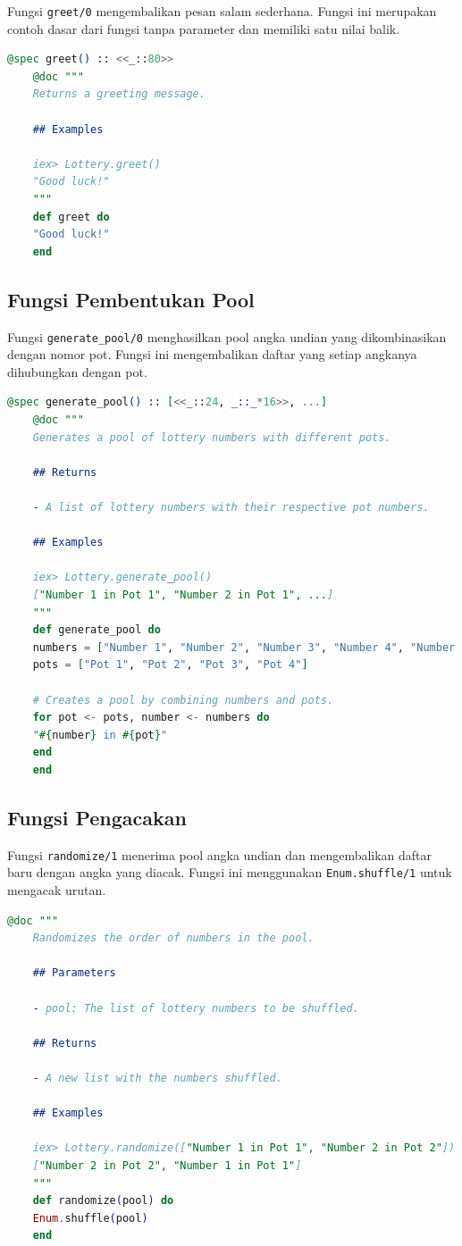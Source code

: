 Fungsi \texttt{greet/0} mengembalikan pesan salam sederhana. Fungsi ini merupakan contoh dasar dari fungsi tanpa parameter dan memiliki satu nilai balik.

\begin{lstlisting}[language=elixir, caption={Fungsi Salam}]
	@spec greet() :: <<_::80>>
	@doc """
	Returns a greeting message.
	
	## Examples
	
	iex> Lottery.greet()
	"Good luck!"
	"""
	def greet do
	"Good luck!"
	end
\end{lstlisting}

\subsection{Fungsi Pembentukan Pool}

Fungsi \texttt{generate\_pool/0} menghasilkan pool angka undian yang dikombinasikan dengan nomor pot. Fungsi ini mengembalikan daftar yang setiap angkanya dihubungkan dengan pot.

\begin{lstlisting}[language=elixir, caption={Fungsi Pembentukan Pool}]
	@spec generate_pool() :: [<<_::24, _::_*16>>, ...]
	@doc """
	Generates a pool of lottery numbers with different pots.
	
	## Returns
	
	- A list of lottery numbers with their respective pot numbers.
	
	## Examples
	
	iex> Lottery.generate_pool()
	["Number 1 in Pot 1", "Number 2 in Pot 1", ...]
	"""
	def generate_pool do
	numbers = ["Number 1", "Number 2", "Number 3", "Number 4", "Number 5", "Number 6"]
	pots = ["Pot 1", "Pot 2", "Pot 3", "Pot 4"]
	
	# Creates a pool by combining numbers and pots.
	for pot <- pots, number <- numbers do
	"#{number} in #{pot}"
	end
	end
\end{lstlisting}

\subsection{Fungsi Pengacakan}

Fungsi \texttt{randomize/1} menerima pool angka undian dan mengembalikan daftar baru dengan angka yang diacak. Fungsi ini menggunakan \texttt{Enum.shuffle/1} untuk mengacak urutan.

\begin{lstlisting}[language=elixir, caption={Fungsi Pengacakan}]
	@doc """
	Randomizes the order of numbers in the pool.
	
	## Parameters
	
	- pool: The list of lottery numbers to be shuffled.
	
	## Returns
	
	- A new list with the numbers shuffled.
	
	## Examples
	
	iex> Lottery.randomize(["Number 1 in Pot 1", "Number 2 in Pot 2"])
	["Number 2 in Pot 2", "Number 1 in Pot 1"]
	"""
	def randomize(pool) do
	Enum.shuffle(pool)
	end
\end{lstlisting}

